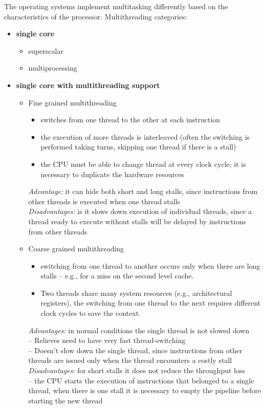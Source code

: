 The operating systems implement multitasking differently based on the characteristics of the processor.
Multithreading categories:
\begin{itemize}
    \item \textbf{single core}
    \begin{itemize}
        \item superscalar
        \item multiprocessing
    \end{itemize}

    \item \textbf{single core with multithreading support} 
    \begin{itemize}
        \item Fine grained multithreading
        \begin{itemize}
            \item switches from one thread to the other at each instruction
            \item the execution of more threads is interleaved (often the switching is performed taking turns,
            skipping one thread if there is a stall)
            \item the CPU must be able to change thread at every clock cycle;
            it is necessary to duplicate the hardware resources
        \end{itemize}
        \textrightarrow \textit{Advantage:} it can hide both short and long stalls, since instructions from other
        threads is executed when one thread stalls\\
        \textrightarrow \textit{Disadvantages:} is it slows down execution of individual threads, since a thread ready to
        execute without stalls will be delayed by instructions from other threads


        \item Coarse grained multithreading
        \begin{itemize}
            \item switching from one thread to another occurs only when there are long stalls -- e.g., for a miss on
            the second level cache.
            \item Two threads share many system resources (e.g., architectural registers), the switching from one
            thread to the next requires different clock cycles to save the context.
        \end{itemize}
        \textrightarrow \textit{Advantages:} in normal conditions the single thread is not slowed down\\
        – Relieves need to have very fast thread-switching\\
        – Doesn’t slow down the single thread, since instructions from other threads are issued only when the thread
        encounters a costly stall\\
        \textrightarrow \textit{Disadvantages}: for short stalls it does not reduce the throughput loss\\
        – the CPU starts the execution of instructions that belonged to a single thread, when there is one stall it is
        necessary to empty the pipeline before starting the new thread


\end{itemize}
\end{itemize}
